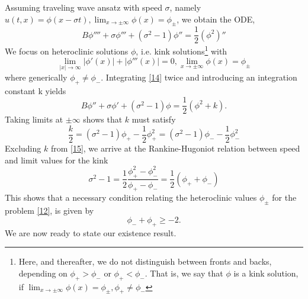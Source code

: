 \documentclass[12pt]{amsart}
\theoremstyle{definition}
\theoremstyle{remark}
\numberwithin{equation}{section}
\renewcommand{\(}{\left(}
\renewcommand{\)}{\right)}
\renewcommand{\[}{\left[}
\renewcommand{\]}{\right]}
\newcommand{\f}[2]{\frac{#1}{#2}}
\newcommand{\si}{\sigma}
\begin{document}
Assuming traveling wave ansatz with speed $\si$, namely 
$u(t,x)=\phi(x- \si t), \lim_{x\to \pm \infty}\phi(x)= \phi_\pm$, we obtain the ODE, 
\begin{equation}
	\label{14} 
	B \phi''''+\si  \phi'''+(\si^2-1) \phi''= \f{1}{2}  (\phi^2)'' 
\end{equation}
We focus on heteroclinic solutions   $\phi$, i.e.  kink solutions\footnote{Here, and thereafter, we do not distinguish between  fronts and backs, depending on $\phi_+>\phi_-$ or $\phi_+<\phi_-$. That is, we say that $\phi$ is a kink solution, if  $\lim_{x\to \pm \infty}\phi(x)=\phi_\pm, \phi_+\neq \phi_-$} with 
$$
\lim_{|x|\to \infty} |\phi'(x)|+|\phi'''(x)|=0, \lim_{x\to \pm \infty}\phi(x)=\phi_\pm
$$
 where generically $\phi_+\neq \phi_-$. 
 Integrating \eqref{14}  twice and introducing an integration constant k yields 
 \begin{equation}
 	\label{141} 
 	B \phi''+\si  \phi'+(\si^2-1) \phi= \f{1}{2}(\phi^2 + k).
 \end{equation}
 Taking limits at $\pm \infty$ shows  that $k$ must satisfy 
 \begin{equation}
 	\label{15} 
 	\f{k}{2} =(\si^2-1) \phi_+ - \f{1}{2} \phi_{+}^2=(\si^2-1) \phi_- -\f{1}{2} \phi_-^2
 \end{equation}
 Excluding $k$ from \eqref{15}, we arrive at the Rankine-Hugoniot relation between speed and limit values for the kink 
 \begin{equation}
 	\label{161} 
 	\si^2-1=\f{1}{2} \frac{\phi_+^2- \phi_-^2}{\phi_+-\phi_-}=\f{1}{2} (\phi_+ + \phi_-)
 \end{equation}
 This shows that a necessary condition relating the heteroclinic values $\phi_\pm$ for the problem \eqref{12},  is given by 
 \begin{equation}
 	\label{16} 
 	\phi_- + \phi_+\geq -2.
 \end{equation}
We are now ready to state our existence result. 
\end{document}
